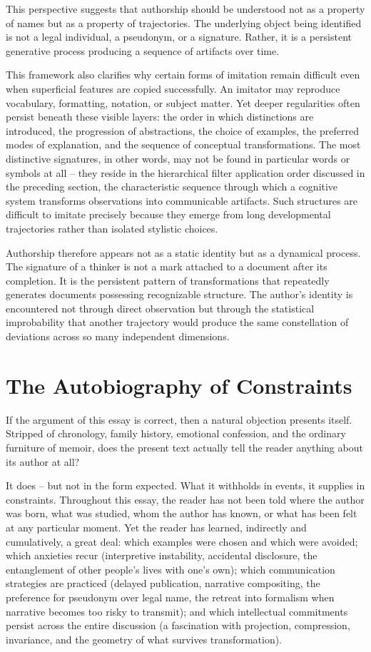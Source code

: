 \documentclass[11pt]{article}
\theoremstyle{plain}
\begin{document}
This perspective suggests that authorship should be understood not as a property of names but as a property of trajectories. The underlying object being identified is not a legal individual, a pseudonym, or a signature. Rather, it is a persistent generative process producing a sequence of artifacts over time.

This framework also clarifies why certain forms of imitation remain difficult even when superficial features are copied successfully. An imitator may reproduce vocabulary, formatting, notation, or subject matter. Yet deeper regularities often persist beneath these visible layers: the order in which distinctions are introduced, the progression of abstractions, the choice of examples, the preferred modes of explanation, and the sequence of conceptual transformations. The most distinctive signatures, in other words, may not be found in particular words or symbols at all -- they reside in the hierarchical filter application order discussed in the preceding section, the characteristic sequence through which a cognitive system transforms observations into communicable artifacts. Such structures are difficult to imitate precisely because they emerge from long developmental trajectories rather than isolated stylistic choices.

Authorship therefore appears not as a static identity but as a dynamical process. The signature of a thinker is not a mark attached to a document after its completion. It is the persistent pattern of transformations that repeatedly generates documents possessing recognizable structure. The author's identity is encountered not through direct observation but through the statistical improbability that another trajectory would produce the same constellation of deviations across so many independent dimensions.

\section{The Autobiography of Constraints}

If the argument of this essay is correct, then a natural objection presents itself. Stripped of chronology, family history, emotional confession, and the ordinary furniture of memoir, does the present text actually tell the reader anything about its author at all?

It does -- but not in the form expected. What it withholds in events, it supplies in constraints. Throughout this essay, the reader has not been told where the author was born, what was studied, whom the author has known, or what has been felt at any particular moment. Yet the reader has learned, indirectly and cumulatively, a great deal: which examples were chosen and which were avoided; which anxieties recur (interpretive instability, accidental disclosure, the entanglement of other people's lives with one's own); which communication strategies are practiced (delayed publication, narrative compositing, the preference for pseudonym over legal name, the retreat into formalism when narrative becomes too risky to transmit); and which intellectual commitments persist across the entire discussion (a fascination with projection, compression, invariance, and the geometry of what survives transformation).
\end{document}
